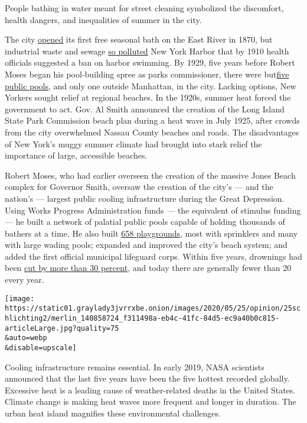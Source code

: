 People bathing in water meant for street cleaning symbolized the
discomfort, health dangers, and inequalities of summer in the city.

The city \href{https://www.nycgovparks.org/about/history/pools}{opened}
its first free seasonal bath on the East River in 1870, but industrial
waste and sewage
\href{https://babel.hathitrust.org/cgi/pt?id=coo1.ark:/13960/t1jh43s08\&view=1up\&seq=8}{so
polluted} New York Harbor that by 1910 health officials suggested a ban
on harbor swimming. By 1929, five years before Robert Moses began his
pool-building spree as parks commissioner, there were
but\href{https://www.nycgovparks.org/about/history/pools}{five public
pools}, and only one outside Manhattan, in the city. Lacking options,
New Yorkers sought relief at regional beaches. In the 1920s, summer heat
forced the government to act. Gov. Al Smith announced the creation of
the Long Island State Park Commission beach plan during a heat wave in
July 1925, after crowds from the city overwhelmed Nassau County beaches
and roads. The disadvantages of New York's muggy summer climate had
brought into stark relief the importance of large, accessible beaches.

Robert Moses, who had earlier overseen the creation of the massive Jones
Beach complex for Governor Smith, oversaw the creation of the city's ---
and the nation's --- largest public cooling infrastructure during the
Great Depression. Using Works Progress Administration funds --- the
equivalent of stimulus funding --- he built a network of palatial public
pools capable of holding thousands of bathers at a time. He also built
\href{https://www.nytimes3xbfgragh.onion/1981/07/30/obituaries/robert-moses-master-builder-is-dead-at-92.html}{658
playgrounds}, most with sprinklers and many with large wading pools;
expanded and improved the city's beach system; and added the first
official municipal lifeguard corps. Within five years, drownings had
been
\href{https://nypost.com/2020/04/17/1940-city-parks-dept-report-links-decrease-in-drownings-with-opening-pools/}{cut
by more than 30 percent}, and today there are generally fewer than 20
every year.

\texttt{[image: https://static01.graylady3jvrrxbe.onion/images/2020/05/25/opinion/25schlichting2/merlin\_140858724\_f311498a-eb4c-41fc-84d5-ec9a40b0c815-articleLarge.jpg?quality=75\\\&auto=webp\\\&disable=upscale]}

Cooling infrastructure remains essential. In early 2019, NASA scientists
announced that the last five years have been the five hottest recorded
globally. Excessive heat is a leading cause of weather-related deaths in
the United States. Climate change is making heat waves more frequent and
longer in duration. The urban heat island magnifies these environmental
challenges.

